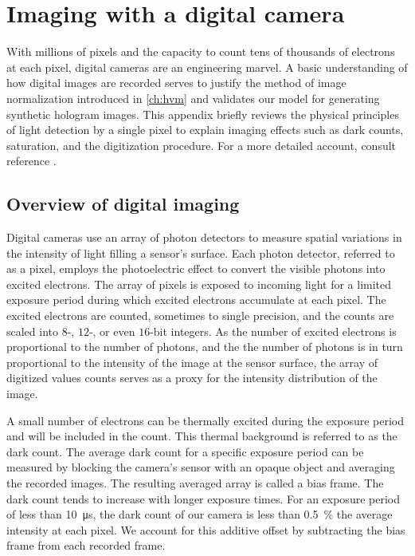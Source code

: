 \SkipTocEntry\chapter*{Imaging with a digital camera} 
\label{app:digital_imaging}

With millions of pixels and the capacity to count tens of thousands of electrons
at each pixel, digital cameras are an engineering marvel. 
A basic understanding of how digital images are recorded serves to justify the
method of image normalization introduced in \autoref{ch:hvm}
and validates our model for generating synthetic
hologram images. This appendix briefly reviews the physical
principles of light detection by a single pixel to explain imaging effects such as
dark counts, saturation, and the digitization procedure. For a more detailed account,
consult reference \cite{nakamura2017}.

\section{Overview of digital imaging}

Digital cameras use an array of photon detectors to measure spatial variations in the
intensity of light filling a sensor's surface. Each photon detector, referred to as a pixel,
employs the photoelectric effect to convert the visible photons into
excited electrons.
The array of pixels is exposed to incoming light for a limited
exposure period during which excited electrons accumulate at each pixel.
The excited electrons are counted, sometimes to single precision,
and the counts are scaled into $8$-, $12$-, or even $16$-bit integers. As the number of
excited electrons is proportional to the number of photons, and the the number of
photons is in turn proportional to the intensity of the image at the
sensor surface, the array of digitized values counts serves as a proxy for
the intensity distribution of the image.

A small number of electrons can be thermally excited during the exposure period and
will be included in the count. This thermal background is referred to
as the dark count. The average dark count for a specific exposure period can be measured
by blocking the camera's sensor with an opaque object and averaging the
recorded images. The resulting averaged array is called a bias frame.
The dark count tends to increase with longer exposure times.
For an exposure period of less than \SI{10}{\us}, the dark
count of our camera is less than \SI{0.5}{\percent} the average intensity
at each pixel. We account for this additive offset by subtracting the bias
frame from each recorded frame.

